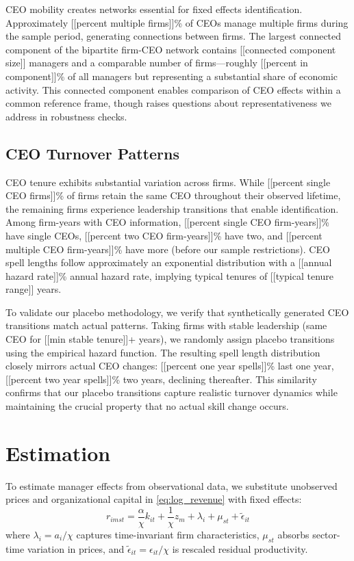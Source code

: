\documentclass[11pt,a4paper]{article}
\begin{document}
CEO mobility creates networks essential for fixed effects identification. Approximately [[percent multiple firms]]\% of CEOs manage multiple firms during the sample period, generating connections between firms. The largest connected component of the bipartite firm-CEO network contains [[connected component size]] managers and a comparable number of firms—roughly [[percent in component]]\% of all managers but representing a substantial share of economic activity. This connected component enables comparison of CEO effects within a common reference frame, though raises questions about representativeness we address in robustness checks.

\subsection{CEO Turnover Patterns}

CEO tenure exhibits substantial variation across firms. While [[percent single CEO firms]]\% of firms retain the same CEO throughout their observed lifetime, the remaining firms experience leadership transitions that enable identification. Among firm-years with CEO information, [[percent single CEO firm-years]]\% have single CEOs, [[percent two CEO firm-years]]\% have two, and [[percent multiple CEO firm-years]]\% have more (before our sample restrictions). CEO spell lengths follow approximately an exponential distribution with a [[annual hazard rate]]\% annual hazard rate, implying typical tenures of [[typical tenure range]] years.

To validate our placebo methodology, we verify that synthetically generated CEO transitions match actual patterns. Taking firms with stable leadership (same CEO for [[min stable tenure]]+ years), we randomly assign placebo transitions using the empirical hazard function. The resulting spell length distribution closely mirrors actual CEO changes: [[percent one year spells]]\% last one year, [[percent two year spells]]\% two years, declining thereafter. This similarity confirms that our placebo transitions capture realistic turnover dynamics while maintaining the crucial property that no actual skill change occurs.

\section{Estimation}
To estimate manager effects from observational data, we substitute unobserved prices and organizational capital in \eqref{eq:log_revenue} with fixed effects:
\begin{equation}\label{eq:empirical}
r_{imst} = \frac{\alpha}{\chi} k_{it} + \frac{1}{\chi}z_m + \lambda_i + \mu_{st} + \tilde{\epsilon}_{it}
\end{equation}
where $\lambda_i = a_i/\chi$ captures time-invariant firm characteristics, $\mu_{st}$ absorbs sector-time variation in prices, and $\tilde{\epsilon}_{it} = \epsilon_{it}/\chi$ is rescaled residual productivity.
\end{document}
